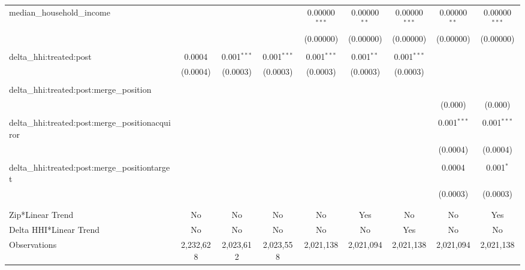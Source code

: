 \begin{table}[H]
{\begin{tabular}{@{\extracolsep{5pt}}lcccccccc}
  median\_household\_income &  &  &  & 0.00000$^{***}$ & 0.00000$^{**}$ & 0.00000$^{***}$ & 0.00000$^{**}$ & 0.00000$^{***}$ \\  

   &  &  &  & (0.00000) & (0.00000) & (0.00000) & (0.00000) & (0.00000) \\  

   & & & & & & & & \\  

  delta\_hhi:treated:post & 0.0004 & 0.001$^{***}$ & 0.001$^{***}$ & 0.001$^{***}$ & 0.001$^{**}$ & 0.001$^{***}$ &  &  \\  

   & (0.0004) & (0.0003) & (0.0003) & (0.0003) & (0.0003) & (0.0003) &  &  \\  

   & & & & & & & & \\  

  delta\_hhi:treated:post:merge\_position &  &  &  &  &  &  &  &  \\  

   &  &  &  &  &  &  & (0.000) & (0.000) \\  

   & & & & & & & & \\  

  delta\_hhi:treated:post:merge\_positionacquiror &  &  &  &  &  &  & 0.001$^{***}$ & 0.001$^{***}$ \\  

   &  &  &  &  &  &  & (0.0004) & (0.0004) \\  

   & & & & & & & & \\  

  delta\_hhi:treated:post:merge\_positiontarget &  &  &  &  &  &  & 0.0004 & 0.001$^{*}$ \\  

   &  &  &  &  &  &  & (0.0003) & (0.0003) \\  

   & & & & & & & & \\  

 \hline \\[-1.8ex]  

 Zip*Linear Trend & No & No & No & No & Yes & No & No & Yes \\  

 Delta HHI*Linear Trend & No & No & No & No & No & Yes & No & No \\  

 Observations & 2,232,628 & 2,023,612 & 2,023,558 & 2,021,138 & 2,021,094 & 2,021,138 & 2,021,094 & 2,021,138 \\  


\end{tabular}}
\end{table}
